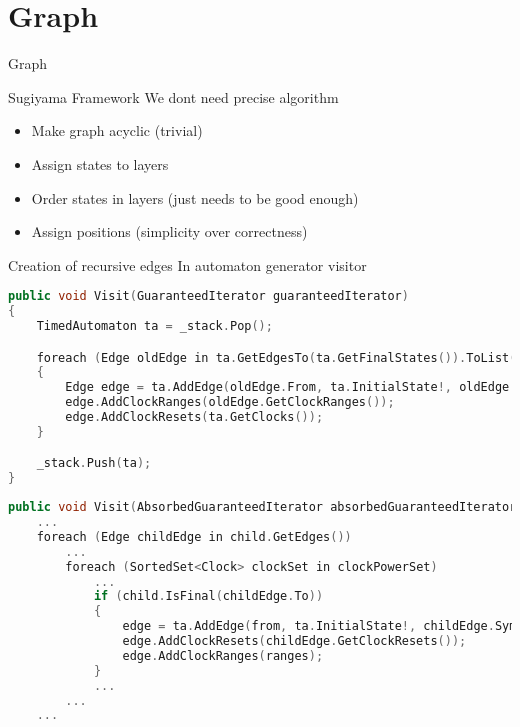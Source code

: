 \begin{frame}
    
    
\end{frame}

\section{Graph}
\begin{frame}[shrink=5]{Graph}
    \begin{center}
        
    \end{center}
\end{frame}
\begin{frame}{Sugiyama Framework}
    We dont need precise algorithm
    \begin{itemize}
        \item Make graph acyclic (trivial)
        \item Assign states to layers
        \item Order states in layers (just needs to be good enough)
        \item Assign positions (simplicity over correctness)
    \end{itemize}
\end{frame}

\begin{frame}[fragile]{Creation of recursive edges}
    In automaton generator visitor
    \begin{lstlisting}[language=c++,basicstyle=\tiny]
public void Visit(GuaranteedIterator guaranteedIterator)
{
    TimedAutomaton ta = _stack.Pop();

    foreach (Edge oldEdge in ta.GetEdgesTo(ta.GetFinalStates()).ToList())
    {
        Edge edge = ta.AddEdge(oldEdge.From, ta.InitialState!, oldEdge.Symbol, true);
        edge.AddClockRanges(oldEdge.GetClockRanges());
        edge.AddClockResets(ta.GetClocks());
    }

    _stack.Push(ta);
}
    \end{lstlisting}
    \begin{lstlisting}[language=c++,basicstyle=\tiny]
public void Visit(AbsorbedGuaranteedIterator absorbedGuaranteedIterator)
    ...
    foreach (Edge childEdge in child.GetEdges())
        ...
        foreach (SortedSet<Clock> clockSet in clockPowerSet)
            ...    
            if (child.IsFinal(childEdge.To))
            {
                edge = ta.AddEdge(from, ta.InitialState!, childEdge.Symbol, true);
                edge.AddClockResets(childEdge.GetClockResets());
                edge.AddClockRanges(ranges);
            }
            ...
        ...
    ...
    \end{lstlisting}
\end{frame}

